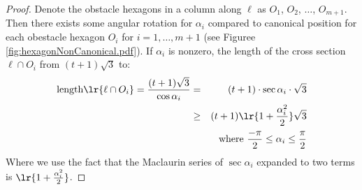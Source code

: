 \begin{proof}
Denote the obstacle hexagons in a column along $\ell$ as $O_1$, $O_2$, $\ldots$, $O_{m+1}$.
Then there exists some angular rotation for $\alpha_i$ compared to canonical position for each obestacle hexagon $O_i$ for $i = 1 , \ldots, m+1$ (see Figuree \ref{fig:hexagonNonCanonical.pdf}).
If $\alpha_i$ is nonzero, the length of the cross section $\ell \cap O_i$ from $(t+1) \sqrt{3}$ to:%
\begin{eqnarray*}
\text{length}\lr{\ell \cap O_i}=\frac{(t+1) \sqrt{3}}{\cos \alpha_i} &=& (t+1) \cdot \sec \alpha_i \cdot \sqrt{3}\\
&\geq& (t+1) \lr{1 + \frac{\alpha_i^2}{2}} \sqrt{3}\\
&&\text{ where } \frac{-\pi}{2} \leq \alpha_i \leq \frac{\pi}{2}
\end{eqnarray*}
Where we use the fact that the Maclaurin series of $\sec \alpha_i$ expanded to two terms is $\lr{1 + \frac{\alpha_i^2}{2}} $.






\end{proof}
